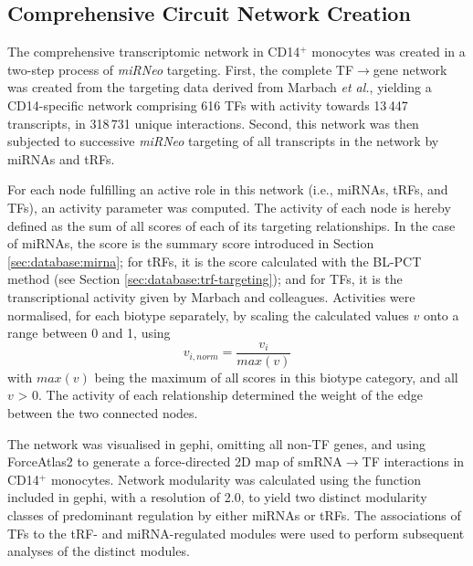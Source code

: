 \begin{method}

\subsection{Comprehensive Circuit Network Creation} \label{sec:stroke:circuit-network}
The comprehensive transcriptomic network in CD14$^+$ monocytes was created in a two-step process of \emph{miRNeo} targeting. First, the complete TF$\to$gene network was created from the targeting data derived from Marbach \emph{et al.}\cite{Marbach2016}, yielding a CD14-specific network comprising 616 TFs with activity towards 13\,447 transcripts, in 318\,731 unique interactions. Second, this network was then subjected to successive \emph{miRNeo} targeting of all transcripts in the network by miRNAs and tRFs.

For each node fulfilling an active role in this network (i.e., miRNAs, tRFs, and TFs), an activity parameter was computed. The activity of each node is hereby defined as the sum of all scores of each of its targeting relationships. In the case of miRNAs, the score is the summary score introduced in Section \ref{sec:database:mirna}; for tRFs, it is the score calculated with the BL-PCT method (see Section \ref{sec:database:trf-targeting}); and for TFs, it is the transcriptional activity given by Marbach and colleagues.\cite{Marbach2016} Activities were normalised, for each biotype separately, by scaling the calculated values $v$ onto a range between 0 and 1, using $$v_{i, norm} = \frac{v_i}{max(v)}$$
with $max(v)$ being the maximum of all scores in this biotype category, and all $v$ > 0. The activity of each relationship determined the weight of the edge between the two connected nodes.

The network was visualised in gephi,\cite{Jacomy2014} omitting all non-TF genes, and using ForceAtlas2 to generate a force-directed 2D map of smRNA$\to$TF interactions in CD14$^+$ monocytes. Network modularity was calculated using the function included in gephi,\cite{Blondel2008} with a resolution of 2.0, to yield two distinct modularity classes of predominant regulation by either miRNAs or tRFs. The associations of TFs to the tRF- and miRNA-regulated modules were used to perform subsequent analyses of the distinct modules. 


\end{method}
